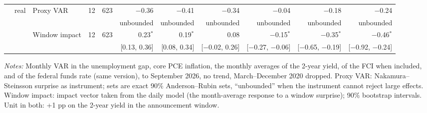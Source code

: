 \begin{table}[tp]
{\begin{tabular}{lllcrrrrrrr}
 & real & Proxy VAR & 12 & 623 & $-$0.36 & $-$0.41 & $-$0.34 & $-$0.04 & $-$0.18 & $-$0.24\\
 & & & & & {\tiny unbounded} & {\tiny unbounded} & {\tiny unbounded} & {\tiny unbounded} & {\tiny unbounded} & {\tiny unbounded}\\
 &  & Window impact & 12 & 623 & 0.23$^{*}$ & 0.19$^{*}$ & 0.08 & $-$0.15$^{*}$ & $-$0.35$^{*}$ & $-$0.46$^{*}$\\
 & & & & & {\tiny [0.13, 0.36]} & {\tiny [0.08, 0.34]} & {\tiny [$-$0.02, 0.26]} & {\tiny [$-$0.27, $-$0.06]} & {\tiny [$-$0.65, $-$0.19]} & {\tiny [$-$0.92, $-$0.24]}\\
\bottomrule\end{tabular}}
\begin{flushleft}\footnotesize\textit{Notes:} Monthly VAR in the unemployment gap, core PCE inflation, the monthly averages of the 2-year yield, of the FCI when included, and of the federal funds rate (same version), to September 2026, no trend, March--December 2020 dropped. Proxy VAR: Nakamura--Steinsson surprise as instrument; sets are exact 90\% Anderson--Rubin sets, ``unbounded'' when the instrument cannot reject large effects. Window impact: impact vector taken from the daily model (the month-average response to a window surprise); 90\% bootstrap intervals. Unit in both: +1 pp on the 2-year yield in the announcement window.\end{flushleft}
\end{table}
